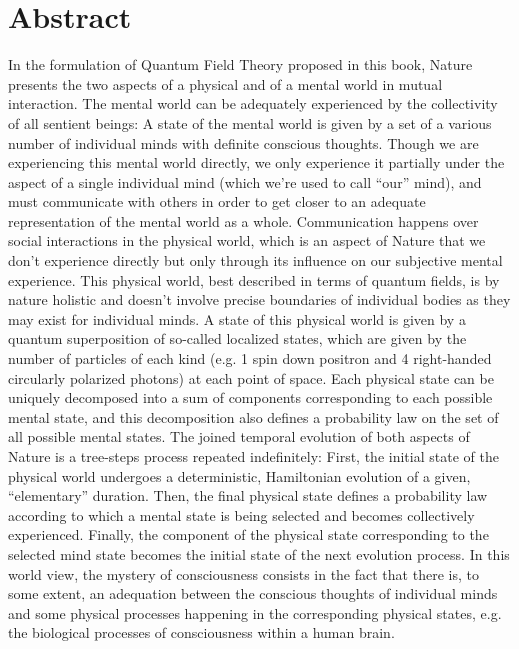 \documentclass[10pt,a4paper,twoside,openany]{book}
\begin{document}

\section*{Abstract}

In the formulation of Quantum Field Theory proposed in this book, Nature presents the two aspects of a physical and of a mental world in mutual interaction. The mental world can be adequately experienced by the collectivity of all sentient beings: A state of the mental world is given by a set of a various number of individual minds with definite conscious thoughts. Though we are experiencing this mental world directly, we only experience it partially under the aspect of a single individual mind (which we're used to call ``our'' mind), and must communicate with others in order to get closer to an adequate representation of the mental world as a whole. Communication happens over social interactions in the physical world, which is an aspect of Nature that we don't experience directly but only through its influence on our subjective mental experience. This physical world, best described in terms of quantum fields, is by nature holistic and doesn't involve precise boundaries of individual bodies as they may exist for individual minds. A state of this physical world is given by a quantum superposition of so-called localized states, which are given by the number of particles of each kind (e.g. 1 spin down positron and 4 right-handed circularly polarized photons) at each point of space. Each physical state can be uniquely decomposed into a sum of components corresponding to each possible mental state, and this decomposition also defines a probability law on the set of all possible mental states. The joined temporal evolution of both aspects of Nature is a tree-steps process repeated indefinitely: First, the initial state of the physical world undergoes a deterministic, Hamiltonian evolution of a given, ``elementary'' duration. Then, the final physical state defines a probability law according to which a mental state is being selected and becomes collectively experienced. Finally, the component of the physical state corresponding to the selected mind state becomes the initial state of the next evolution process. In this world view, the mystery of consciousness consists in the fact that there is, to some extent, an adequation between the conscious thoughts of individual minds and some physical processes happening in the corresponding physical states, e.g. the biological processes of consciousness within a human brain.
\end{document}
